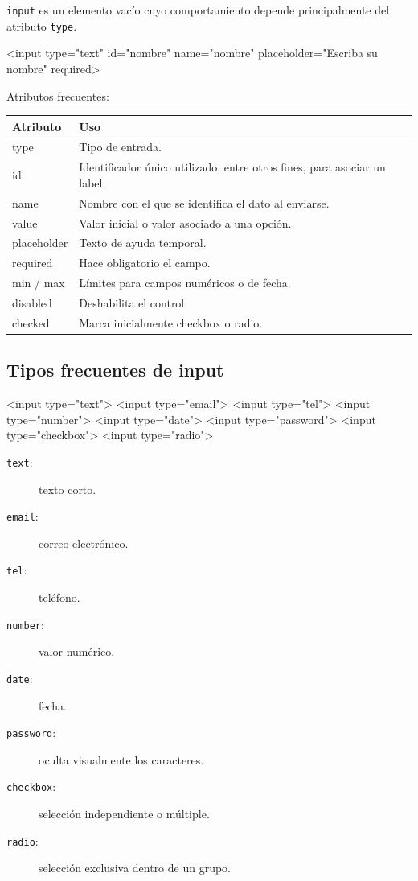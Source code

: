 \documentclass[11pt]{article}
\begin{document}
\texttt{input} es un elemento vacío cuyo comportamiento depende principalmente del atributo \texttt{type}.

\begin{htmlcodedark}
    <input
    type="text"
    id="nombre"
    name="nombre"
    placeholder="Escriba su nombre"
    required>
\end{htmlcodedark}

Atributos frecuentes:

\begin{center}
    \begin{tabularx}{0.95\textwidth}{>{\ttfamily}p{2.6cm}X}
        \toprule
        \textnormal{Atributo} & \textnormal{Uso} \\
        \midrule
        type & Tipo de entrada. \\
        id & Identificador único utilizado, entre otros fines, para asociar un label. \\
        name & Nombre con el que se identifica el dato al enviarse. \\
        value & Valor inicial o valor asociado a una opción. \\
        placeholder & Texto de ayuda temporal. \\
        required & Hace obligatorio el campo. \\
        min / max & Límites para campos numéricos o de fecha. \\
        disabled & Deshabilita el control. \\
        checked & Marca inicialmente checkbox o radio. \\
        \bottomrule
    \end{tabularx}
\end{center}

\subsection{Tipos frecuentes de input}

\begin{htmlcodedark}
    <input type="text">
    <input type="email">
    <input type="tel">
    <input type="number">
    <input type="date">
    <input type="password">
    <input type="checkbox">
    <input type="radio">
\end{htmlcodedark}

\begin{description}
    \item[\texttt{text}:] texto corto.
    \item[\texttt{email}:] correo electrónico.
    \item[\texttt{tel}:] teléfono.
    \item[\texttt{number}:] valor numérico.
    \item[\texttt{date}:] fecha.
    \item[\texttt{password}:] oculta visualmente los caracteres.
    \item[\texttt{checkbox}:] selección independiente o múltiple.
    \item[\texttt{radio}:] selección exclusiva dentro de un grupo.
\end{description}
\end{document}
